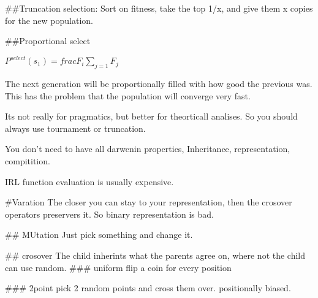 ##Truncation selection:
Sort on fitness, take the top 1/x, and give them x copies for the new
population.

##Proportional select

$P^{select}(s_1) = frac{F_i}{\sum_{j=1}F_j}$

The next generation will be proportionally filled with how good the previous
was. This has the problem that the population will converge very fast.

Its not really for pragmatics, but better for theorticall analises.
So you should always use tournament or truncation.

You don't need to have all darwenin properties,
Inheritance, representation, compitition.

IRL function evaluation is usually expensive.

#Varation
The closer you can stay to your representation, then the crosover operators
preservers it. So binary representation is bad.

## MUtation
Just pick something and change it.

## crosover
The child inherints what the parents agree on,
where not the child can use random.
### uniform
flip a coin for every position

### 2point
pick 2 random points and cross them over.
positionally biased.
